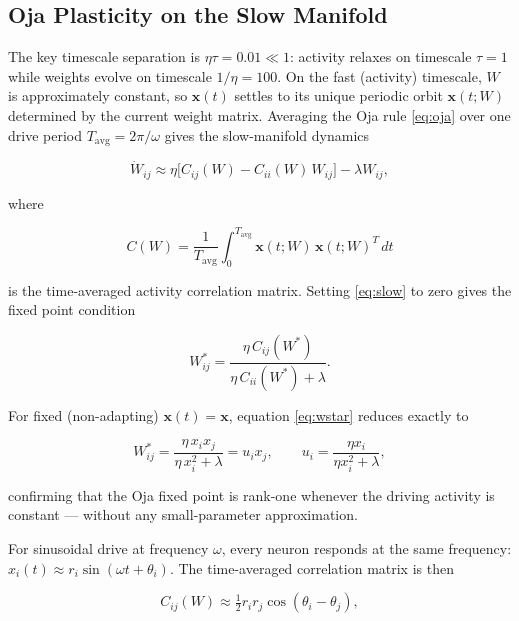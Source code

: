 \documentclass[paper=a4, fontsize=11pt]{scrartcl} %
\numberwithin{equation}{section} %
\numberwithin{figure}{section} %
\numberwithin{table}{section} %
\begin{document}
\subsection{Oja Plasticity on the Slow Manifold}

The key timescale separation is $\eta\tau = 0.01 \ll 1$: activity relaxes on
timescale $\tau = 1$ while weights evolve on timescale $1/\eta = 100$.  On the fast
(activity) timescale, $W$ is approximately constant, so $\mathbf{x}(t)$ settles to
its unique periodic orbit $\mathbf{x}(t; W)$ determined by the current weight matrix.
Averaging the Oja rule \eqref{eq:oja} over one drive period
$T_{\mathrm{avg}} = 2\pi/\omega$ gives the slow-manifold dynamics

\begin{equation}
    \dot{W}_{ij} \approx \eta\bigl[C_{ij}(W) - C_{ii}(W)\,W_{ij}\bigr] - \lambda W_{ij},
    \label{eq:slow}
\end{equation}

where

\begin{equation}
    C(W) = \frac{1}{T_{\mathrm{avg}}}\int_0^{T_{\mathrm{avg}}}
    \mathbf{x}(t;W)\,\mathbf{x}(t;W)^T\,dt
\end{equation}

is the time-averaged activity correlation matrix.  Setting \eqref{eq:slow} to zero
gives the fixed point condition

\begin{equation}
    W_{ij}^* = \frac{\eta\,C_{ij}(W^*)}{\eta\,C_{ii}(W^*) + \lambda}.
    \label{eq:wstar}
\end{equation}

For fixed (non-adapting) $\mathbf{x}(t) = \mathbf{x}$, equation \eqref{eq:wstar}
reduces exactly to

\begin{equation}
    W_{ij}^* = \frac{\eta\,x_i x_j}{\eta\,x_i^2 + \lambda} = u_i x_j, \qquad
    u_i = \frac{\eta x_i}{\eta x_i^2 + \lambda},
\end{equation}

confirming that the Oja fixed point is rank-one whenever the driving activity is
constant — without any small-parameter approximation.

For sinusoidal drive at frequency $\omega$, every neuron responds at the same
frequency: $x_i(t) \approx r_i\sin(\omega t + \theta_i)$.  The time-averaged
correlation matrix is then

\begin{equation}
    C_{ij}(W) \approx \tfrac{1}{2} r_i r_j \cos(\theta_i - \theta_j),
\end{equation}
\end{document}
